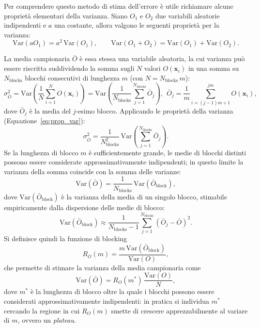 Per comprendere questo metodo di stima dell'errore è utile richiamare alcune proprietà elementari della varianza. Siano $O_1$ e $O_2$ due variabili aleatorie indipendenti e $a$ una costante, allora valgono le seguenti proprietà per la varianza:
\begin{equation}
    \label{eq:prop_var}
    \mathrm{Var}(aO_1) = a^2\, \mathrm{Var}(O_1), \qquad \mathrm{Var}(O_1+O_2) = \mathrm{Var}(O_1) + \mathrm{Var}(O_2).
\end{equation}

La media campionaria $\bar O$ è essa stessa una variabile aleatoria, la cui varianza può essere riscritta suddividendo la somma sugli $N$ valori $O(\mathbf{x}_i)$ in una somma su $N_{\mathrm{blocks}}$ blocchi consecutivi di lunghezza $m$ (con $N = N_{\mathrm{blocks}}\, m$):
\begin{equation}
    \sigma^2_{\bar O} = \mathrm{Var}\!\left( \frac{1}{N} \sum_{i=1}^{N} O(\mathbf{x}_i)\right) = \mathrm{Var}\!\left( \frac{1}{N_{\mathrm{blocks}}} \sum_{j=1}^{N_{\mathrm{blocks}}} \bar{O}_j \right), \ \ \bar{O}_j = \frac{1}{m} \sum_{i=(j-1)m+1}^{jm} O(\mathbf{x}_i),
\end{equation}
dove $\bar O_j$ è la media del $j$-esimo blocco.
Applicando le proprietà della varianza (Equazione~\ref{eq:prop_var}):
\begin{equation}
    \sigma^2_{\bar O} = \frac{1}{N_{\mathrm{blocks}}^2}\, \mathrm{Var}\!\left( \sum_{j=1}^{N_{\mathrm{blocks}}} \bar{O}_j \right).
\end{equation} Se la lunghezza di blocco $m$ è sufficientemente grande, le medie di blocchi distinti possono essere considerate approssimativamente indipendenti; in questo limite la varianza della somma coincide con la somma delle varianze:
\begin{equation}
    \mathrm{Var}(\bar O) = \frac{1}{N_{\mathrm{blocks}}}\, \mathrm{Var}(\bar O_{\mathrm{block}}),
\end{equation}
dove $\mathrm{Var}(\bar O_{\mathrm{block}})$ è la varianza della media di un singolo blocco, stimabile empiricamente dalla dispersione delle medie di blocco:
\begin{equation}
    \mathrm{Var}(\bar O_{\mathrm{block}}) \approx \frac{1}{N_{\mathrm{blocks}}-1} \sum_{j=1}^{N_{\mathrm{blocks}}} \left(\bar O_j - \bar O\right)^2.
\end{equation} Si definisce quindi la funzione di blocking
\begin{equation}
    R_O(m) = \frac{m\, \mathrm{Var}(\bar O_{\mathrm{block}})}{\mathrm{Var}(O)},
\end{equation}
che permette di stimare la varianza della media campionaria come
\begin{equation}
    \mathrm{Var}(\bar O) = R_O(m^*)\, \frac{\mathrm{Var}(O)}{N},
\end{equation}
dove $m^*$ è la lunghezza di blocco oltre la quale i blocchi possono essere considerati approssimativamente indipendenti: in pratica si individua $m^*$ cercando la regione in cui $R_O(m)$ smette di crescere apprezzabilmente al variare di $m$, ovvero un \emph{plateau}.

